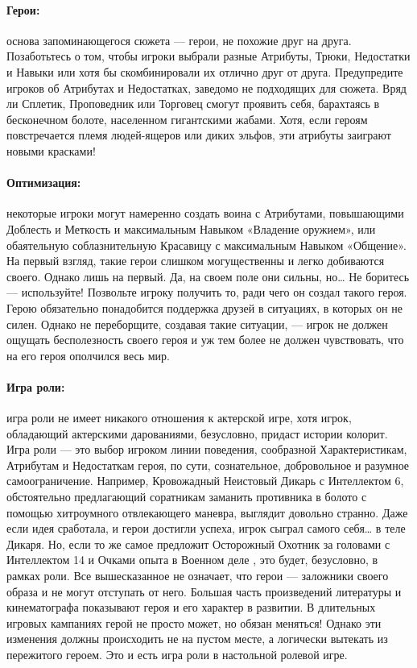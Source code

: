 \paragraph{Герои:} основа запоминающегося сюжета — герои, не похожие друг на друга. Позаботьтесь о том, чтобы игроки выбрали разные Атрибуты, Трюки, Недостатки и Навыки или хотя бы скомбинировали их отлично друг от друга. Предупредите игроков об Атрибутах и Недостатках, заведомо не подходящих для сюжета. Вряд ли Сплетик, Проповедник или Торговец смогут проявить себя, барахтаясь в бесконечном болоте, населенном гигантскими жабами. Хотя, если героям повстречается племя людей-ящеров или диких эльфов, эти атрибуты заиграют новыми красками!
\paragraph{Оптимизация:} некоторые игроки могут намеренно создать воина с Атрибутами, повышающими Доблесть и Меткость и максимальным Навыком «Владение оружием», или обаятельную соблазнительную Красавицу с максимальным Навыком «Общение». На первый взгляд, такие герои слишком могущественны и легко добиваются своего. Однако лишь на первый. Да, на своем поле они сильны, но… Не боритесь — используйте! Позвольте игроку получить то, ради чего он создал такого героя. Герою обязательно понадобится поддержка друзей в ситуациях, в которых он не силен. Однако не переборщите, создавая такие ситуации, — игрок не должен ощущать бесполезность своего героя и уж тем более не должен чувствовать, что на его героя ополчился весь мир.
\paragraph{Игра роли:} игра роли не имеет никакого отношения к актерской игре, хотя игрок, обладающий актерскими дарованиями, безусловно, придаст истории колорит. Игра роли — это выбор игроком линии поведения, сообразной Характеристикам, Атрибутам и Недостаткам героя, по сути, сознательное, добровольное и разумное самоограничение. Например, Кровожадный Неистовый Дикарь с Интеллектом 6, обстоятельно предлагающий соратникам заманить противника в болото с помощью хитроумного отвлекающего маневра, выглядит довольно странно. Даже если идея сработала, и герои достигли успеха, игрок сыграл самого себя… в теле Дикаря.
Но, если то же самое предложит Осторожный Охотник за головами с Интеллектом 14 и Очками опыта в Военном деле , это будет, безусловно, в рамках роли. Все вышесказанное не означает, что герои — заложники своего образа и не могут отступать от него. Большая часть произведений литературы и кинематографа показывают героя и его характер в развитии. В длительных игровых кампаниях герой не просто может, но обязан меняться! Однако эти изменения должны происходить не на пустом месте, а логически вытекать из пережитого героем. Это и есть игра роли в настольной ролевой игре.
